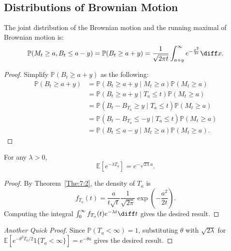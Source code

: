 \subsection{Distributions of Brownian Motion}
\begin{theorem}
The joint distribution of the Brownian motion and the running maximal of Brownian motion is:
\[
\mathbb{P}(M_t\ge a, B_t\le a-y) = \mathbb{P}(B_t\ge a+y) = \frac{1}{\sqrt{2\pi t}}\int_{a+y}^\infty e^{-\frac{x^2}{2t}}\diff x.
\]
\end{theorem}
\begin{proof}
Simplify $\mathbb{P}(B_t\ge a+y)$ as the following:
\begin{align*}
\mathbb{P}(B_t\ge a+y)&= \mathbb{P}(B_t\ge a+y\mid M_t\ge a)\mathbb{P}(M_t\ge a)\\
&=\mathbb{P}(B_t\ge a+y\mid T_a\le t)\mathbb{P}(M_t\ge a)\\
&=\mathbb{P}(B_t-B_{T_a}\ge y\mid T_a\le t)\mathbb{P}(M_t\ge a)\\
&=\mathbb{P}(B_t-B_{T_a}\le -y\mid T_a\le t)\mathbb{P}(M_t\ge a)\\
&=\mathbb{P}(B_t\le a-y\mid M_t\ge a)\mathbb{P}(M_t\ge a).
\end{align*}
\end{proof}

\begin{theorem}
For any $\lambda>0$,
\[
\mathbb{E}[e^{-\lambda T_a}] = e^{-\sqrt{2\lambda}a}.
\]
\end{theorem}

\begin{proof}
By Theorem~\ref{The:7:2}, the density of $T_a$ is 
\[
f_{T_a}(t) = \frac{a}{t\sqrt{t}}\frac{1}{\sqrt{2\pi}}\exp\left(-\frac{a^2}{2t}\right).
\]
Computing the integral $\int_0^{\infty}f_{T_a}(t)e^{-\lambda t}\diff t$ gives the desired result.
\end{proof}
\begin{proof}[Another Quick Proof]
Since $\mathbb{P}(T_a<\infty)=1$, substituting $\theta$ with $\sqrt{2\lambda}$
for $\mathbb{E}[e^{- \theta^2T_a/2}1\{T_a<\infty\}]=e^{-\theta a}$ gives the desired result.
\end{proof}

